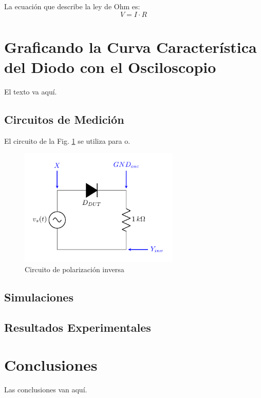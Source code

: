 \documentclass[journal]{IEEEtran}
\begin{document}
La ecuación que describe la ley de Ohm es:
\begin{equation}
	V=I\cdot R
\end{equation}

\section{Graficando la Curva Característica del Diodo con el Osciloscopio}
El texto va aquí.

\subsection{Circuitos de Medición}
El circuito de la Fig. \ref{fig_cir2} se utiliza para o.

\begin{figure}[!ht]
\centering
\includegraphics[width=3in]{circuito_3}
\caption{Circuito de polarización inversa}
\label{fig_cir2}
\end{figure}

\subsection{Simulaciones}
\subsection{Resultados Experimentales}


\section{Conclusiones}
Las conclusiones van aquí.
\end{document}
